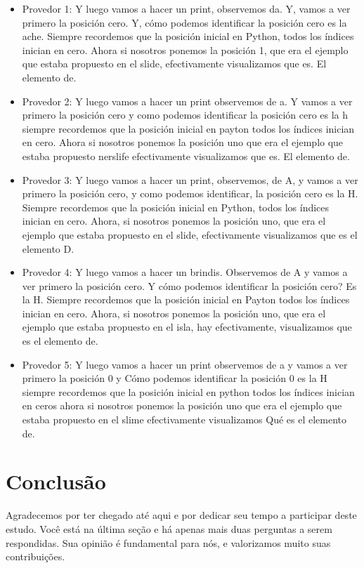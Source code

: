 \begin{itemize}
    \item Provedor 1: Y luego vamos a hacer un print, observemos da. Y, vamos a ver primero la posición cero. Y, cómo podemos identificar la posición cero es la ache. Siempre recordemos que la posición inicial en Python, todos los índices inician en cero. Ahora si nosotros ponemos la posición 1, que era el ejemplo que estaba propuesto en el slide, efectivamente visualizamos que es. El elemento de.
    \item Provedor 2: Y luego vamos a hacer un print observemos de a. Y vamos a ver primero la posición cero y como podemos identificar la posición cero es la h siempre recordemos que la posición inicial en payton todos los índices inician en cero. Ahora si nosotros ponemos la posición uno que era el ejemplo que estaba propuesto nerslife efectivamente visualizamos que es. El elemento de.
    \item Provedor 3: Y luego vamos a hacer un print, observemos, de A, y vamos a ver primero la posición cero, y como podemos identificar, la posición cero es la H. Siempre recordemos que la posición inicial en Python, todos los índices inician en cero. Ahora, si nosotros ponemos la posición uno, que era el ejemplo que estaba propuesto en el slide, efectivamente visualizamos que es el elemento D.
    \item Provedor 4: Y luego vamos a hacer un brindis. Observemos de A y vamos a ver primero la posición cero. Y cómo podemos identificar la posición cero? Es la H. Siempre recordemos que la posición inicial en Payton todos los índices inician en cero. Ahora, si nosotros ponemos la posición uno, que era el ejemplo que estaba propuesto en el isla, hay efectivamente, visualizamos que es el elemento de.
    \item Provedor 5: Y luego vamos a hacer un print observemos de a y vamos a ver primero la posición 0 y Cómo podemos identificar la posición 0 es la H siempre recordemos que la posición inicial en python todos los índices inician en ceros ahora si nosotros ponemos la posición uno que era el ejemplo que estaba propuesto en el slime efectivamente visualizamos Qué es el elemento de.
\end{itemize}


\section{Conclusão}

Agradecemos por ter chegado até aqui e por dedicar seu tempo a participar deste estudo. 
Você está na última seção e há apenas mais duas perguntas a serem respondidas. Sua 
opinião é fundamental para nós, e valorizamos muito suas contribuições.


